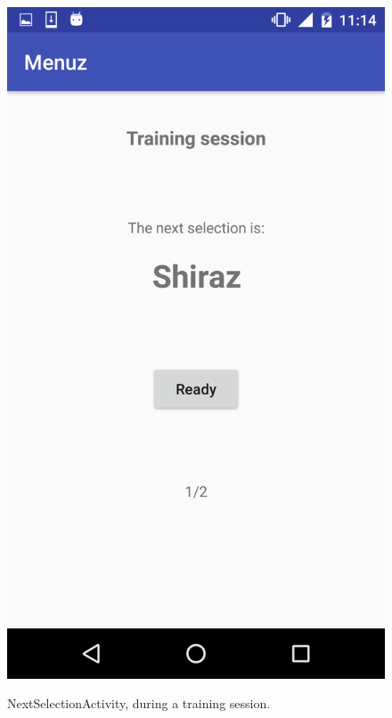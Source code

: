 \begin{figure}[!ht]
  \begin{center}
    \includegraphics[scale=0.22]{img/nextselect_activity.png}
    \label{fig:nextselect_activity}
    \caption{NextSelectionActivity, during a training session.}
  \end{center}
\end{figure}

\newpage

